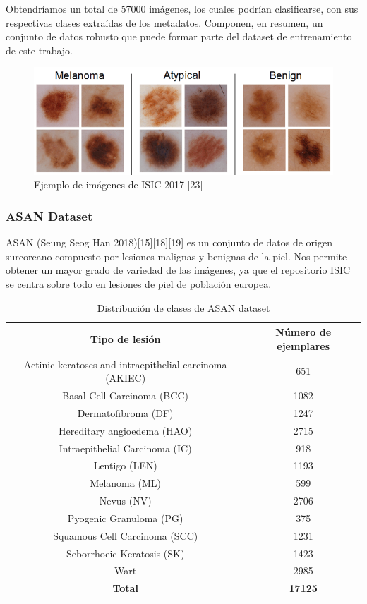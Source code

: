 Obtendríamos un total de 57000 imágenes, los cuales podrían clasificarse, con sus respectivas clases extraídas de los metadatos. Componen, en resumen, un conjunto de datos robusto que puede formar parte del dataset de entrenamiento de este trabajo.
\begin{figure}[H]
	\centering
	\includegraphics[scale = 0.5]{imagenes/Ejemplo2020.png}
	\caption{Ejemplo de imágenes de ISIC 2017 [23]}
	\label{fig:enter-label}
\end{figure}

\subsubsection{ASAN Dataset}

ASAN (Seung Seog Han 2018)[15][18][19] es un conjunto de datos de origen surcoreano compuesto por lesiones malignas y benignas de la piel. Nos permite obtener un mayor grado de variedad de las imágenes, ya que el repositorio ISIC se centra sobre todo en lesiones de piel de población europea. 

\begin{table}[H]
	\centering
	\begin{tabular}{|c|c|}
		\hline
		\textbf{Tipo de lesión} & \textbf{Número de ejemplares} \\ \hline
		{Actinic keratoses and intraepithelial carcinoma (AKIEC)} & 651 \\ \hline
		{Basal Cell Carcinoma (BCC)} & 1082 \\ \hline
		{Dermatofibroma (DF)} & 1247 \\ \hline
		{Hereditary angioedema (HAO)} & 2715 \\ \hline
		{Intraepithelial Carcinoma (IC)} & 918 \\ \hline
		{Lentigo (LEN)} & 1193 \\ \hline
		{Melanoma (ML)} & 599 \\ \hline
		{Nevus (NV)} & 2706 \\ \hline
		{Pyogenic Granuloma (PG)}  & 375 \\ \hline
		{Squamous Cell Carcinoma (SCC)} & 1231 \\ \hline
		{Seborrhoeic Keratosis (SK)}  & 1423 \\ \hline
		{Wart} & 2985 \\ \hline
		\textbf{Total} & \textbf{17125} \\ \hline
	\end{tabular}
	\caption{Distribución de clases de ASAN dataset}
\end{table}


